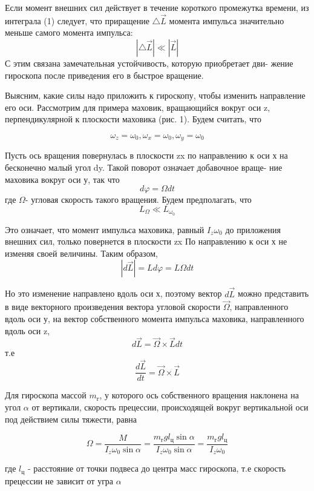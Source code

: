 \documentclass[a4paper]{article}
\begin{document}
Если момент внешних сил действует в течение короткого промежутка времени, из интеграла (1) следует, что приращение $\bigtriangleup \overrightarrow{L} $  момента импульса значительно меньше самого момента импульса:
\[\left\lvert\bigtriangleup \overrightarrow{L} \right\rvert \ll \left\lvert \overrightarrow{L} \right\rvert  \]
С этим связана замечательная устойчивость, которую приобретает дви- жение гироскопа после приведения его в быстрое вращение.\par

Выясним, какие силы надо приложить к гироскопу, чтобы изменить направление его оси. Рассмотрим для примера маховик, вращающийся вокруг оси z, перпендикулярной к плоскости маховика (рис. 1). Будем считать, что


\[\omega_{z} = \omega_{0} , \omega_{x} = \omega_{0}, \omega_{y} = \omega_{0}\]

Пусть ось вращения повернулась в плоскости zx по направлению к оси х на бесконечно малый угол dy. Такой поворот означает добавочное враще- ние маховика вокруг оси у, так что
\[d\varphi  = \Omega dt \]
где $\Omega $- угловая скорость такого вращения. Будем предполагать, что 
\[L_{\Omega }\ll L_{\omega_{0}}\] \newpage

Это означает, что момент импульса маховика,
равный $I_{z}\omega _{0}$ до приложения внешних сил, только повернется в плоскости zx По направлению к оси х не изменяя своей величины. Таким образом,
\[\left\lvert d\overrightarrow{L} \right\rvert = Ld\varphi  = L\Omega dt\]

Но это изменение направлено вдоль оси х, поэтому вектор $d\overrightarrow{L} $ можно представить в виде векторного произведения вектора угловой скорости $\overrightarrow{\Omega } $, направленного вдоль оси у, на вектор собственного момента
импульса маховика, направленного вдоль оси z,
\[d\overrightarrow{L} = \overrightarrow{\Omega } \times  \overrightarrow{L}dt\]
т.е
\[\frac{d\overrightarrow{L}}{dt} = \overrightarrow{\Omega } \times \overrightarrow{L}\]

Для гироскопа массой $m_{\text{г}}$, у которого ось собственного вращения наклонена на угол $\alpha $ от вертикали, скорость прецессии, происходящей вокруг вертикальной оси под действием силы тяжести, равна

\[\Omega = \frac{M}{I_{z}\omega _{0}\sin \alpha } = \frac{m_{\text{г}}gl_{\text{ц}}\sin \alpha}{I_{z}\omega _{0}\sin \alpha } = \frac{m_{\text{г}}gl_{\text{ц}}}{I_{z}\omega_{0}} \]

где $l_{\text{ц}}$ - расстояние от точки подвеса до центра масс гироскопа, т.е скорость прецессии не зависит от угра $\alpha $ \par
\end{document}
